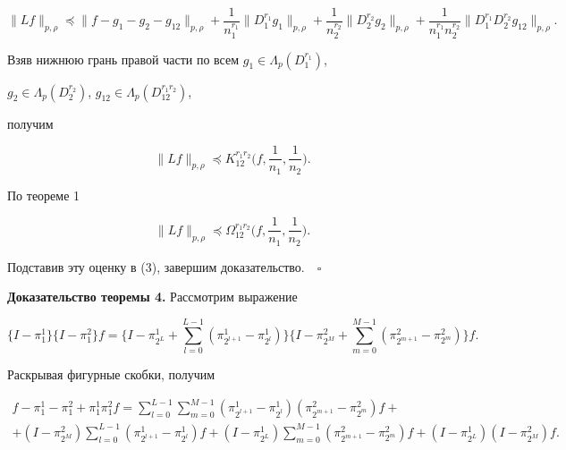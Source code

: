 $$ 


\|L f \|_{p,\rho}\preceq\|f-g_1-g_2-g_{12}\|_{p,\rho}+ 


\frac{1}{n^{r_1}_1}\|D^{r_1}_1g_1\|_{p,\rho}+ 


\frac{1}{n^{r_2}_2}\|D^{r_2}_2g_2\|_{p,\rho}+ 


\frac{1}{n^{r_1}_1n^{r_2}_2}\|D^{r_1}_1D^{r_2}_2g_{12}\|_{p,\rho}. 


$$ 


Взяв нижнюю грань правой части по всем $g_1\in\Lambda_p(D^{r_1}_1)$, 


$g_2\in\Lambda_p(D^{r_2}_2)$, $g_{12}\in\Lambda_p(D^{r_1r_2}_{12})$, 


получим 


$$ 


\|L f\|_{p,\rho}\preceq K^{r_1r_2}_{12} 


\bigg(f,\frac{1}{n_1},\frac{1}{n_2} \bigg). 


$$ 


По теореме 1 


$$ 


\|L f\|_{p,\rho}\preceq \Omega^{r_1r_2}_{12} 


\bigg(f,\frac{1}{n_1},\frac{1}{n_2} \bigg). 


$$ 


Подставив эту оценку в (3), завершим доказательство.$\quad\square$ 


 


{\bf Доказательство теоремы 4.} Рассмотрим выражение 


$$ 


\{I-\pi^1_1\}\{I-\pi^2_1\}f=\bigg\{I-\pi^1_{2^L}+ 


\sum^{L-1}_{l=0}(\pi^1_{2^{l+1}}-\pi^1_{2^l})\bigg\} 


\bigg\{I-\pi^2_{2^M}+\sum^{M-1}_{m=0} 


(\pi^2_{2^{m+1}}-\pi^2_{2^m})\bigg\}f. 


$$ 


Раскрывая фигурные скобки, получим 


\begin{multline} 


f-\pi^1_1-\pi^2_1+\pi^1_1\pi^2_1f=\sum^{L-1}_{l=0} 


\sum^{M-1}_{m=0}(\pi^1_{2^{l+1}}-\pi^1_{2^l}) 


(\pi^2_{2^{m+1}}-\pi^2_{2^m})f+\\ 


% 


+(I-\pi^2_{2^M})\sum^{L-1}_{l=0} 


(\pi^1_{2^{l+1}}-\pi^1_{2^l})f+(I-\pi^1_{2^L}) 


\sum^{M-1}_{m=0}(\pi^2_{2^{m+1}}-\pi^2_{2^m})f+ 


(I-\pi^1_{2^L})(I-\pi^2_{2^M})f. 


\end{multline} 


